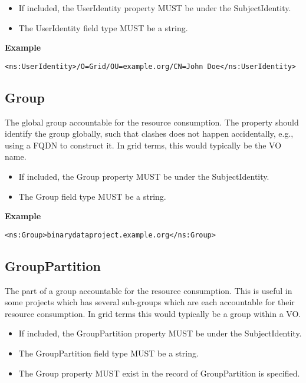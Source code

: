 \begin{itemize}
\item If included, the UserIdentity property MUST be under the
SubjectIdentity.
\item The UserIdentity field type MUST be a string.
\end{itemize}

{\bf Example}
\begin{verbatim}
<ns:UserIdentity>/O=Grid/OU=example.org/CN=John Doe</ns:UserIdentity>
\end{verbatim}


\subsection{Group}

The global group accountable for the resource consumption. The property should
identify the group globally, such that clashes does not happen accidentally,
e.g., using a FQDN to construct it. In grid terms, this would typically be the
VO name.

\begin{itemize}
\item If included, the Group property MUST be under the SubjectIdentity.
\item The Group field type MUST be a string.
\end{itemize}

{\bf Example}
\begin{verbatim}
<ns:Group>binarydataproject.example.org</ns:Group>
\end{verbatim}


\subsection{GroupPartition}

The part of a group accountable for the resource consumption. This is useful in
some projects which has several sub-groups which are each accountable for their
resource consumption. In grid terms this would typically be a group within a
VO.

\begin{itemize}
\item If included, the GroupPartition property MUST be under the
SubjectIdentity.
\item The GroupPartition field type MUST be a string.
\item The Group property MUST exist in the record of GroupPartition is
    specified.
\end{itemize}

